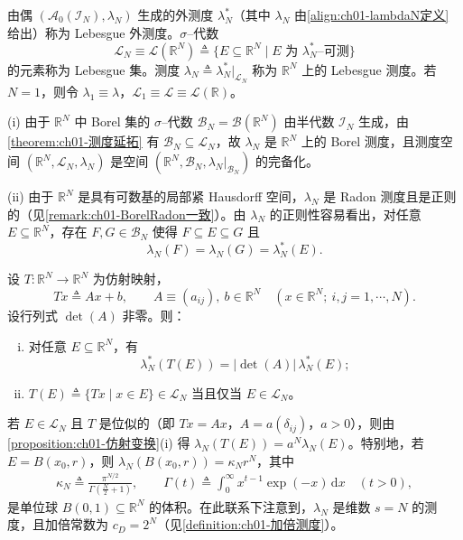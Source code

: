 \documentclass[../../main.tex]{subfiles}%
\begin{document}
\begin{definition}\label{definition:ch01-Lebesgue测度}
由偶 $(\mathcal{A}_0(\mathcal{I}_N),\lambda_N)$ 生成的外测度 $\lambda_N^*$（其中 $\lambda_N$ 由\eqref{align:ch01-lambdaN定义} 给出）称为 Lebesgue 外测度。$\sigma$--代数
\[
\mathcal{L}_N\equiv\mathcal{L}(\mathbb{R}^N)\triangleq \{E\subseteq\mathbb{R}^N\mid E\text{ 为 }\lambda_N^*\text{--可测}\}
\]
的元素称为 Lebesgue 集。测度 $\lambda_N\triangleq \lambda_N^*|_{\mathcal{L}_N}$ 称为 $\mathbb{R}^N$ 上的 Lebesgue 测度。若 $N=1$，则令 $\lambda_1\equiv\lambda$，$\mathcal{L}_1\equiv\mathcal{L}\equiv\mathcal{L}(\mathbb{R})$。
\end{definition}
\begin{remark}\label{remark:ch01-Lebesgue性质}

(i) 由于 $\mathbb{R}^N$ 中 Borel 集的 $\sigma$--代数 $\mathcal{B}_N=\mathcal{B}(\mathbb{R}^N)$ 由半代数 $\mathcal{I}_N$ 生成，由\cref{theorem:ch01-测度延拓} 有 $\mathcal{B}_N\subseteq\mathcal{L}_N$，故 $\lambda_N$ 是 $\mathbb{R}^N$ 上的 Borel 测度，且测度空间 $(\mathbb{R}^N,\mathcal{L}_N,\lambda_N)$ 是空间 $(\mathbb{R}^N,\mathcal{B}_N,\lambda_N|_{\mathcal{B}_N})$ 的完备化。

(ii) 由于 $\mathbb{R}^N$ 是具有可数基的局部紧 Hausdorff 空间，$\lambda_N$ 是 Radon 测度且是正则的（见\cref{remark:ch01-BorelRadon一致}）。由 $\lambda_N$ 的正则性容易看出，对任意 $E\subseteq\mathbb{R}^N$，存在 $F,G\in\mathcal{B}_N$ 使得 $F\subseteq E\subseteq G$ 且
\[
\lambda_N(F)=\lambda_N(G)=\lambda_N^*(E).
\]
\end{remark}

\begin{proposition}\label{proposition:ch01-仿射变换}
设 $T:\mathbb{R}^N\to\mathbb{R}^N$ 为仿射映射，
\[
Tx\triangleq Ax+b,\qquad A\equiv(a_{ij}),\ b\in\mathbb{R}^N\quad(x\in\mathbb{R}^N;\ i,j=1,\cdots ,N).
\]
设行列式 $\det(A)$ 非零。则：
\begin{enumerate}[(i)]
\item 对任意 $E\subseteq\mathbb{R}^N$，有
\[
\lambda_N^*(T(E))=|\det(A)|\,\lambda_N^*(E);
\]
\item $T(E)\triangleq \{Tx\mid x\in E\}\in\mathcal{L}_N$ 当且仅当 $E\in\mathcal{L}_N$。
\end{enumerate}
\end{proposition}
\begin{remark}\label{remark:ch01-位似}
若 $E\in\mathcal{L}_N$ 且 $T$ 是位似的（即 $Tx=Ax$，$A=a(\delta_{ij})$，$a>0$），则由\cref{proposition:ch01-仿射变换}(i) 得 $\lambda_N(T(E))=a^N\lambda_N(E)$。特别地，若 $E=B(x_0,r)$，则 $\lambda_N(B(x_0,r))=\kappa_N r^N$，其中
\begin{align}
\kappa_N\triangleq \frac{\pi^{N/2}}{\Gamma\left(\frac{N}{2}+1\right)},\qquad
\Gamma(t)\triangleq \int_0^\infty x^{t-1}\exp(-x)\,\mathrm{d}x\quad(t>0), \label{align:ch01-kappaN}
\end{align}
是单位球 $B(0,1)\subseteq\mathbb{R}^N$ 的体积。在此联系下注意到，$\lambda_N$ 是维数 $s=N$ 的测度，且加倍常数为 $c_D=2^N$（见\cref{definition:ch01-加倍测度}）。
\end{remark}
\end{document}
